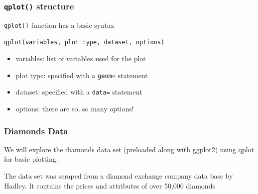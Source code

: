 \documentclass{beamer}\usepackage[]{graphicx}\usepackage[]{color}
\begin{document}
\begin{frame}
\frametitle{\texttt{qplot()} structure}
  \texttt{qplot()} function has a basic syntax

\vspace{.1in}

\begin{center}
\texttt{qplot(variables, plot type, dataset, options)}
\end{center}

\begin{itemize}
  \item variables: list of variables used for the plot\medskip
  \item plot type: specified with a \texttt{geom=} statement\medskip
  \item dataset: specified with a \texttt{data=} statement\medskip
  \item options: there are so, so many options!
\end{itemize}

\end{frame}


\begin{frame}
\frametitle{Diamonds Data}

We will explore the diamonds data set (preloaded along with ggplot2) using qplot for basic plotting.\\
\bigskip

The data set was scraped from a diamond exchange company data base by Hadley.  It contains the prices and attributes of over 50,000 diamonds

\end{frame}

\end{document}
